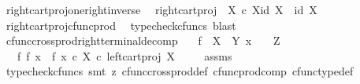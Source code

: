 \begin{isabellebody}
\endisatagproof
{\isafoldproof}%
%
\isadelimproof
\isanewline
%
\endisadelimproof
\isanewline
{}\isamarkupfalse%
\ right{\isacharunderscore}{\kern0pt}cart{\isacharunderscore}{\kern0pt}proj{\isacharunderscore}{\kern0pt}one{\isacharunderscore}{\kern0pt}right{\isacharunderscore}{\kern0pt}inverse{\isacharcolon}{\kern0pt}\isanewline
\ \ {\isachardoublequoteopen}right{\isacharunderscore}{\kern0pt}cart{\isacharunderscore}{\kern0pt}proj\ {\isasymone}\ X\ {\isasymcirc}\isactrlsub c\ {\isasymlangle}{\isasymbeta}\isactrlbsub X\isactrlesub {\isacharcomma}{\kern0pt}id\ X{\isasymrangle}\ {\isacharequal}{\kern0pt}\ id\ X{\isachardoublequoteclose}\isanewline
%
\isadelimproof
\ \ %
\endisadelimproof
%
\isatagproof
{}\isamarkupfalse%
\ right{\isacharunderscore}{\kern0pt}cart{\isacharunderscore}{\kern0pt}proj{\isacharunderscore}{\kern0pt}cfunc{\isacharunderscore}{\kern0pt}prod\ \isamarkupfalse%
\ {\isacharparenleft}{\kern0pt}typecheck{\isacharunderscore}{\kern0pt}cfuncs{\isacharcomma}{\kern0pt}\ blast{\isacharparenright}{\kern0pt}%
\endisatagproof
{\isafoldproof}%
%
\isadelimproof
\isanewline
%
\endisadelimproof
\isanewline
{}\isamarkupfalse%
\ cfunc{\isacharunderscore}{\kern0pt}cross{\isacharunderscore}{\kern0pt}prod{\isacharunderscore}{\kern0pt}right{\isacharunderscore}{\kern0pt}terminal{\isacharunderscore}{\kern0pt}decomp{\isacharcolon}{\kern0pt}\isanewline
\ \ \ {\isachardoublequoteopen}f\ {\isacharcolon}{\kern0pt}\ X\ {\isasymrightarrow}\ Y{\isachardoublequoteclose}\ {\isachardoublequoteopen}x\ {\isacharcolon}{\kern0pt}\ {\isasymone}\ {\isasymrightarrow}\ Z{\isachardoublequoteclose}\isanewline
\ \ \ {\isachardoublequoteopen}f\ {\isasymtimes}\isactrlsub f\ x\ {\isacharequal}{\kern0pt}\ {\isasymlangle}f{\isacharcomma}{\kern0pt}\ x\ {\isasymcirc}\isactrlsub c\ {\isasymbeta}\isactrlbsub X\isactrlesub {\isasymrangle}\ {\isasymcirc}\isactrlsub c\ left{\isacharunderscore}{\kern0pt}cart{\isacharunderscore}{\kern0pt}proj\ X\ {\isasymone}{\isachardoublequoteclose}\isanewline
%
\isadelimproof
\ \ %
\endisadelimproof
%
\isatagproof
{}\isamarkupfalse%
\ assms\ \isamarkupfalse%
\ {\isacharparenleft}{\kern0pt}typecheck{\isacharunderscore}{\kern0pt}cfuncs{\isacharcomma}{\kern0pt}\ smt\ {\isacharparenleft}{\kern0pt}z{}{\isacharparenright}{\kern0pt}\ cfunc{\isacharunderscore}{\kern0pt}cross{\isacharunderscore}{\kern0pt}prod{\isacharunderscore}{\kern0pt}def\ cfunc{\isacharunderscore}{\kern0pt}prod{\isacharunderscore}{\kern0pt}comp\ cfunc{\isacharunderscore}{\kern0pt}type{\isacharunderscore}{\kern0pt}def\isanewline

\end{isabellebody}
